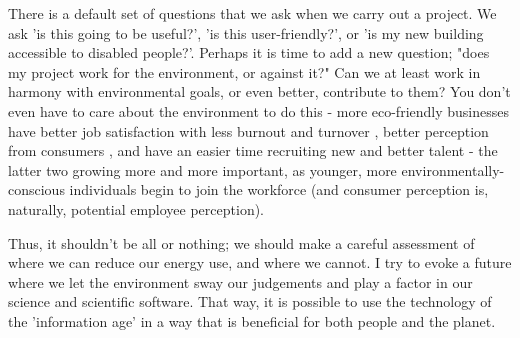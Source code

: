 \documentclass{article}
\begin{document}
There is a default set of questions that we ask when we carry out a project. We ask 'is this going to be useful?', 'is this user-friendly?', or 'is my new building accessible to disabled people?'. Perhaps it is time to add a new question; "does my project work for the environment, or against it?" Can we at least work in harmony with environmental goals, or even better, contribute to them? You don't even have to care about the environment to do this - more eco-friendly businesses have better job satisfaction with less burnout and turnover \citep{yu2020hotels} \citep{reverte2016influence}, better perception from consumers \citep{miles1993eco}, and have an easier time recruiting new and better talent \citep{aranganathan2018green} - the latter two growing more and more important, as younger, more environmentally-conscious individuals begin to join the workforce (and consumer perception is, naturally, potential employee perception).\newline

Thus, it shouldn't be all or nothing; we should make a careful assessment of where we can reduce our energy use, and where we cannot. I try to evoke a future where we let the environment sway our judgements and play a factor in our science and scientific software. That way, it is possible to use the technology of the 'information age' in a way that is beneficial for both people and the planet.



\end{document}
